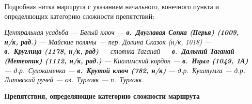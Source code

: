 \documentclass[a4paper, 12pt]{extreport}
\begin{document}
\vspace{0.5cm}
\begin{small}
	Подробная нитка маршрута с указанием начального, конечного пункта и определяющих категорию сложности препятствий:
\end{small}
\vspace{0.5cm}

\normalsize \textit{Центральная усадьба --- Белый ключ --- \textbf{в.~Двуглавая Сопка (Перья) (1009, н/к, рад.)} --- Майские поляны --- пер. Долина Сказок (н/к, 1018) --- \textbf{в.~Круглица (1178, н/к, рад)} --- стоянка Таганай --- \textbf{в.~Дальний Таганай (Метеопик) (1112, н/к, рад.)} --- Киалимский кордон --- \textbf{в.~Ицыл (1049, 1А)} ---  д.р.~Сухокаменка --- \textbf{в.~Крутой ключ (782, н/к)} --- д.р.~Куштумга --- д.р. Липовский ручей --- оз.~Тургояк --- п.~Тургояк.
} 

\newpage

\begin{center}
	{ \large \textbf{Препятствия, определяющие категорию сложности маршрута}}
\end{center}

\vspace{0.5cm}
\end{document}

